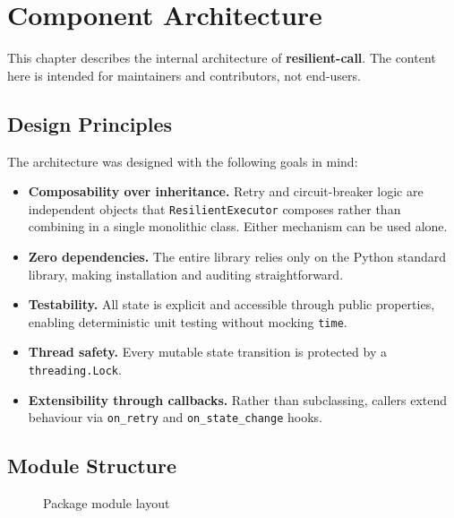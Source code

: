 \chapter{Component Architecture}
\label{ch:architecture}

This chapter describes the internal architecture of \textbf{resilient-call}.
The content here is intended for maintainers and contributors, not end-users.

\section{Design Principles}
\label{sec:design-principles}

The architecture was designed with the following goals in mind:

\begin{itemize}[leftmargin=*, label=\textbullet]
    \item \textbf{Composability over inheritance.} Retry and circuit-breaker
          logic are independent objects that \texttt{ResilientExecutor} composes
          rather than combining in a single monolithic class.  Either mechanism
          can be used alone.
    \item \textbf{Zero dependencies.} The entire library relies only on the
          Python standard library, making installation and auditing
          straightforward.
    \item \textbf{Testability.} All state is explicit and accessible through
          public properties, enabling deterministic unit testing without
          mocking \texttt{time}.
    \item \textbf{Thread safety.} Every mutable state transition is protected
          by a \texttt{threading.Lock}.
    \item \textbf{Extensibility through callbacks.} Rather than subclassing,
          callers extend behaviour via \texttt{on\_retry} and
          \texttt{on\_state\_change} hooks.
\end{itemize}

\section{Module Structure}
\label{sec:module-structure}

\begin{figure}[H]
    \centering
    \caption{Package module layout}
    \label{fig:module-structure}
\end{figure}


